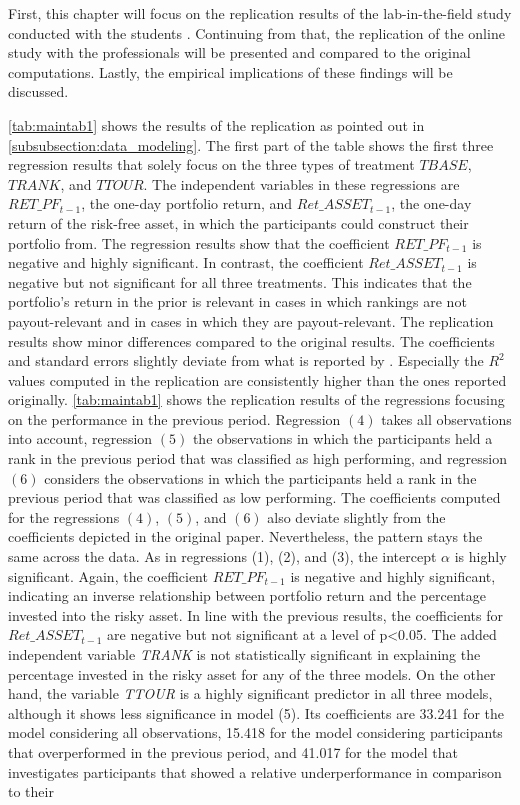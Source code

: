 \documentclass[12pt]{article}
\begin{document}
First, this chapter will focus on the replication results of the lab-in-the-field study conducted with the students \parencite[p.~2284]{Kirchler2018}. Continuing from that, the replication of the online study with the professionals will be presented and compared to the original computations. Lastly, the empirical implications of these findings will be discussed. \par
\autoref{tab:maintab1} shows the results of the replication as pointed out in \autoref{subsubsection:data_modeling}. The first part of the table shows the first three regression results that solely focus on the three types of treatment $TBASE$, $TRANK$, and $TTOUR$. The independent variables in these regressions are $RET\_PF_{t-1}$, the one-day portfolio return, and \textit{$Ret\_ASSET_{t-1}$}, the one-day return of the risk-free asset, in which the participants could construct their portfolio from. The regression results show that the coefficient \textit{$RET\_PF_{t-1}$}  is negative and highly significant. In contrast, the coefficient \textit{$Ret\_ASSET_{t-1}$} is negative but not significant for all three treatments. This indicates that the portfolio's return in the prior is relevant in cases in which rankings are not payout-relevant and in cases in which they are payout-relevant. The replication results show minor differences compared to the original results. The coefficients and standard errors slightly deviate from what is reported by \textcite[p.~2284] {Kirchler2018}. Especially the $R^{2}$ values computed in the replication are consistently higher than the ones reported originally.  \autoref{tab:maintab1} shows the replication results of the regressions focusing on the performance in the previous period. Regression $(4)$ takes all observations into account, regression $(5)$ the observations in which the participants held a rank in the previous period that was classified as high performing, and regression $(6)$ considers the observations in which the participants held a rank in the previous period that was classified as low performing. The coefficients computed for the regressions $(4)$, $(5)$, and $(6)$ also deviate slightly from the coefficients depicted in the original paper. Nevertheless, the pattern stays the same across the data. As in regressions (1), (2), and (3), the intercept $\alpha$ is highly significant. Again, the coefficient \textit{$RET\_PF_{t-1}$} is negative and highly significant, indicating an inverse relationship between portfolio return and the percentage invested into the risky asset. In line with the previous results, the coefficients for \textit{$Ret\_ASSET_{t-1}$} are negative but not significant at a level of p\textless0.05. The added independent variable \textit{TRANK} is not statistically significant in explaining the percentage invested in the risky asset for any of the three models. On the other hand, the variable \textit{TTOUR} is a highly significant predictor in all three models, although it shows less significance in model (5). Its coefficients are 33.241 for the model considering all observations, 15.418 for the model considering participants that overperformed in the previous period, and 41.017 for the model that investigates participants that showed a relative underperformance in comparison to their 
\end{document}
